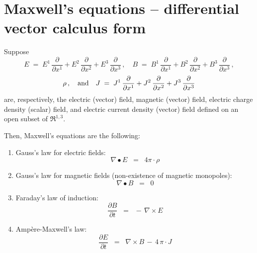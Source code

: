 

\section{Maxwell's equations -- differential vector calculus form}
\setcounter{theorem}{0}
\setcounter{equation}{0}


\renewcommand{\theenumi}{\roman{enumi}}
\renewcommand{\labelenumi}{\textnormal{(\theenumi)}$\;\;$}


Suppose
\begin{equation*}
E \; = \; E^{1}\,\dfrac{\partial}{\partial x^{1}} + E^{2}\,\dfrac{\partial}{\partial x^{2}} + E^{3}\,\dfrac{\partial}{\partial x^{3}}\,,
\quad
B \; = \; B^{1}\,\dfrac{\partial}{\partial x^{1}} + B^{2}\,\dfrac{\partial}{\partial x^{2}} + B^{3}\,\dfrac{\partial}{\partial x^{3}}\,,
\end{equation*}
\begin{equation*}
\rho\,,
\quad\textnormal{and}\quad
J \; = \; J^{1}\,\dfrac{\partial}{\partial x^{1}} + J^{2}\,\dfrac{\partial}{\partial x^{2}} + J^{3}\,\dfrac{\partial}{\partial x^{3}}
\end{equation*}
are, respectively, the electric (vector) field, magnetic (vector) field,
electric charge density (scalar) field, and electric current density (vector) field
defined on an open subset of $\Re^{1,3}$.

\vskip 0.5cm
\noindent
Then, Maxwell's equations are the following:
\vskip 0.75cm
\begin{enumerate}
\item
	Gauss's law for electric fields:
	\begin{equation*}
	\nabla \bullet E \;\; = \;\; 4 \pi \cdot \rho
	\end{equation*}

\item
	Gauss's law for magnetic fields (non-existence of magnetic monopoles):
	\begin{equation*}
	\nabla \bullet B \;\; = \;\; 0
	\end{equation*}

\item
	Faraday's law of induction:
	\begin{equation*}
	\dfrac{\partial B}{\partial t} \;\; = \;\; -\,\nabla \times E
	\end{equation*}

\item
	Amp\`{e}re-Maxwell's law:
	\begin{equation*}
	\dfrac{\partial E}{\partial t} \;\; = \;\; \nabla \times B \,-\, 4\,\pi\cdot J
	\end{equation*}
\end{enumerate}

